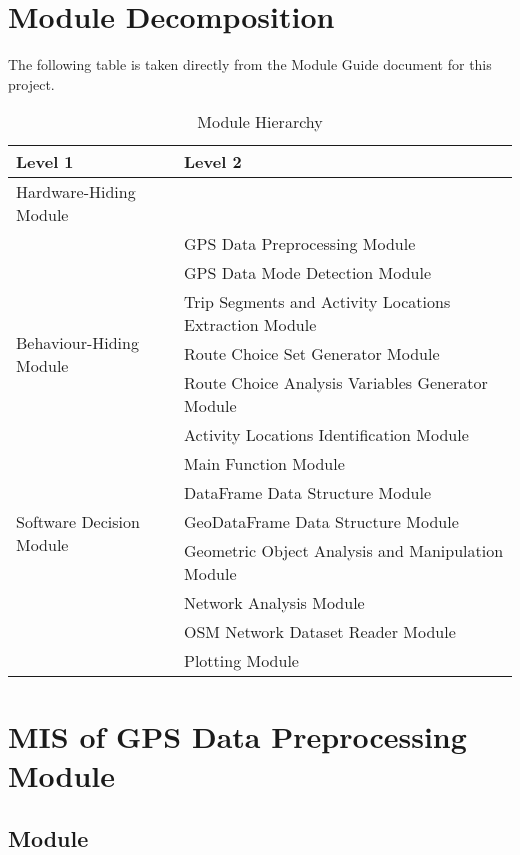 \documentclass[12pt, titlepage]{article}
\begin{document}
\section{Module Decomposition}

The following table is taken directly from the Module Guide document for this project.

\begin{table}[h!]
\centering
\begin{tabular}{p{} p{}}
\toprule
\textbf{Level 1} & \textbf{Level 2}\\
\midrule

{Hardware-Hiding Module} & ~ \\
\midrule

\multirow{7}{0.3\textwidth}{Behaviour-Hiding Module}
& GPS Data Preprocessing Module\\
& GPS Data Mode Detection Module \\
& Trip Segments and Activity Locations Extraction Module\\
& Route Choice Set Generator Module\\
& Route Choice Analysis Variables Generator Module\\
& Activity Locations Identification Module\\
& Main Function Module\\ 
\midrule

\multirow{3}{0.3\textwidth}{Software Decision Module}
& DataFrame Data Structure Module\\
& GeoDataFrame Data Structure Module\\
& Geometric Object Analysis and Manipulation Module\\
& Network Analysis Module\\
& OSM Network Dataset Reader Module\\
& Plotting Module\\
\bottomrule

\end{tabular}
\caption{Module Hierarchy}
\label{TblMH}
\end{table}

\newpage

\section{MIS of GPS Data Preprocessing Module} \label{GPSPreprocess}

\subsection{Module}
\end{document}
